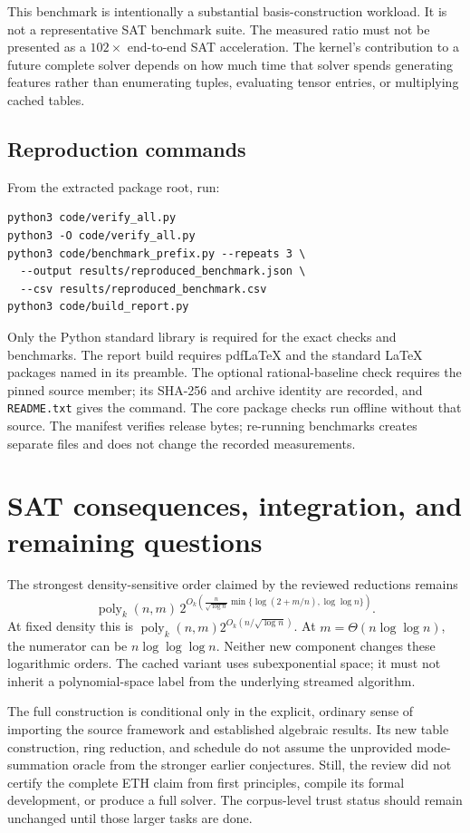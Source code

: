 \documentclass[11pt,letterpaper]{article}
\theoremstyle{definition}\newtheorem{definition}[theorem]{Definition}
\theoremstyle{remark}\newtheorem{remark}[theorem]{Remark}
\newcommand{\poly}{\operatorname{poly}}
\begin{document}
This benchmark is intentionally a substantial basis-construction workload. It is not a
representative SAT benchmark suite. The measured ratio must not be presented as a
$102\times$ end-to-end SAT acceleration. The kernel's contribution to a future complete
solver depends on how much time that solver spends generating features rather than
enumerating tuples, evaluating tensor entries, or multiplying cached tables.

\subsection{Reproduction commands}
From the extracted package root, run:
\begin{verbatim}
python3 code/verify_all.py
python3 -O code/verify_all.py
python3 code/benchmark_prefix.py --repeats 3 \
  --output results/reproduced_benchmark.json \
  --csv results/reproduced_benchmark.csv
python3 code/build_report.py
\end{verbatim}
Only the Python standard library is required for the exact checks and benchmarks.
The report build requires pdfLaTeX and the standard LaTeX packages named in its preamble.
The optional rational-baseline check requires the pinned source member; its SHA-256 and
archive identity are recorded, and \nolinkurl{README.txt} gives the command. The core package
checks run offline without that source. The manifest verifies release bytes; re-running
benchmarks creates separate files and does not change the recorded measurements.

\section{SAT consequences, integration, and remaining questions}
\label{sec:consequences}
The strongest density-sensitive order claimed by the reviewed reductions remains
\begin{equation}\label{eq:sat-envelope}
 \poly_k(n,m)\,
 2^{O_k\!\left(\frac{n}{\sqrt{\log n}}
       \min\{\log(2+m/n),\log\log n\}\right)}.
\end{equation}
At fixed density this is $\poly_k(n,m)2^{O_k(n/\sqrt{\log n})}$.
At $m=\Theta(n\log\log n)$, the numerator can be
$n\log\log\log n$. Neither new component changes these logarithmic orders.
The cached variant uses subexponential space; it must not inherit a polynomial-space
label from the underlying streamed algorithm.

The full construction is conditional only in the explicit, ordinary sense of importing
the source framework and established algebraic results. Its new table construction,
ring reduction, and schedule do not assume the unprovided mode-summation oracle from
the stronger earlier conjectures. Still, the review did not certify the complete ETH
claim from first principles, compile its formal development, or produce a full solver.
The corpus-level trust status should remain unchanged until those larger tasks are done.
\end{document}
